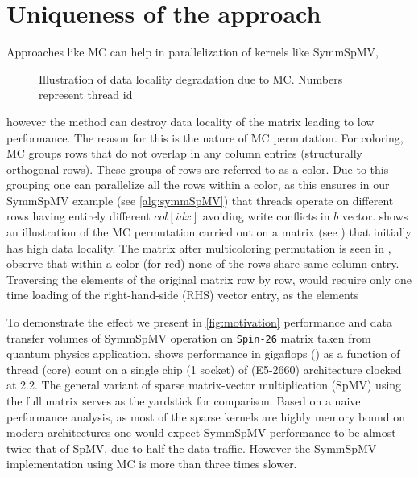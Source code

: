 \section{Uniqueness of the approach} \label{sec:uniqueness}
Approaches like \acrshort{MC} can help in parallelization of kernels like \acrshort{SymmSpMV},
\begin{figure}[tb]
	\centering
	\hspace{0.5em}
	\caption{\label{fig:mc_problem} Illustration of data locality degradation due to \acrshort{MC}.
		Numbers represent thread id}
\end{figure}
however the method can destroy data locality of the matrix leading to low performance.
The reason for this is the nature of \acrlong{MC} 
permutation. For \DTWO coloring, \acrshort{MC}
groups rows that do not overlap in any column 
entries \cite{dist_k_def} (structurally orthogonal rows).
 These groups of rows are referred to as
a color. Due to this grouping one can parallelize all the rows within a color, 
as this ensures in our \acrshort{SymmSpMV} example (see \cref{alg:symmSpMV})
that threads operate on different rows having entirely different 
$col[idx]$ avoiding write conflicts in $b$ vector. 
shows an illustration of the \acrshort{MC} permutation carried out on
a matrix (see ) that initially has high data locality.
The matrix after multicoloring permutation is seen in ,
observe that within a color (for \eg red) none of the rows share same column entry. 
Traversing the elements of the original matrix row by row, would require only 
one time loading of the right-hand-side (RHS) vector entry, as the elements 



To demonstrate the effect we present in \cref{fig:motivation} performance and 
data transfer volumes of  \acrshort{SymmSpMV} operation on \texttt{Spin-26} matrix 
taken from quantum physics application. 
shows performance in gigaflops (\GF) as a function of thread (core) count 
on a single chip (1 socket) of \Intel \IVB (E5-2660) architecture 
clocked at 2.2\GHZ.
The general variant  of sparse matrix-vector multiplication (\acrshort{SpMV})
 using the full matrix  serves as the yardstick for comparison. 
Based on a naive performance analysis, as most of the sparse
kernels are highly memory bound on modern architectures
one would expect \acrshort{SymmSpMV} performance 
to be almost twice that of \acrshort{SpMV}, due to half the data traffic. 
However the \acrshort{SymmSpMV} implementation using \acrshort{MC} is more
than three times slower.


